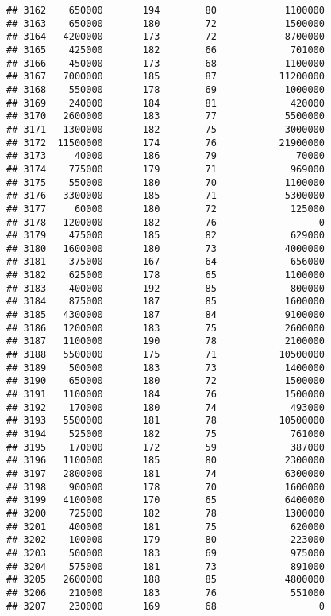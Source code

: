 \documentclass[
]{article}
\begin{document}
\begin{verbatim}
## 3162    650000       194        80            1100000
## 3163    650000       180        72            1500000
## 3164   4200000       173        72            8700000
## 3165    425000       182        66             701000
## 3166    450000       173        68            1100000
## 3167   7000000       185        87           11200000
## 3168    550000       178        69            1000000
## 3169    240000       184        81             420000
## 3170   2600000       183        77            5500000
## 3171   1300000       182        75            3000000
## 3172  11500000       174        76           21900000
## 3173     40000       186        79              70000
## 3174    775000       179        71             969000
## 3175    550000       180        70            1100000
## 3176   3300000       185        71            5300000
## 3177     60000       180        72             125000
## 3178   1200000       182        76                  0
## 3179    475000       185        82             629000
## 3180   1600000       180        73            4000000
## 3181    375000       167        64             656000
## 3182    625000       178        65            1100000
## 3183    400000       192        85             800000
## 3184    875000       187        85            1600000
## 3185   4300000       187        84            9100000
## 3186   1200000       183        75            2600000
## 3187   1100000       190        78            2100000
## 3188   5500000       175        71           10500000
## 3189    500000       183        73            1400000
## 3190    650000       180        72            1500000
## 3191   1100000       184        76            1500000
## 3192    170000       180        74             493000
## 3193   5500000       181        78           10500000
## 3194    525000       182        75             761000
## 3195    170000       172        59             387000
## 3196   1100000       185        80            2300000
## 3197   2800000       181        74            6300000
## 3198    900000       178        70            1600000
## 3199   4100000       170        65            6400000
## 3200    725000       182        78            1300000
## 3201    400000       181        75             620000
## 3202    100000       179        80             223000
## 3203    500000       183        69             975000
## 3204    575000       181        73             891000
## 3205   2600000       188        85            4800000
## 3206    210000       183        76             551000
## 3207    230000       169        68                  0

\end{verbatim}
\end{document}
